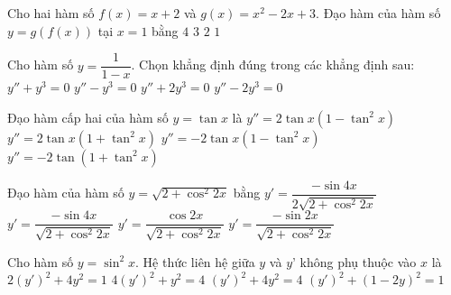 \begin{ex}%
	Cho hai hàm số $f\left( x \right) = x + 2$ và $g\left( x \right) = x^2 - 2x + 3$. Đạo hàm của hàm số $y = g\left( f\left( x \right) \right)$ tại $ x=1 $ bằng
	\choice
	{\True $ 4 $}
	{$ 3 $}
	{$ 2 $}
	{$ 1 $}
	\end{ex}
	
\begin{ex}%
	Cho hàm số $y = \dfrac{1}{{1 - x}}$. Chọn khẳng định đúng trong các khẳng định sau:
	\choice
	{$y'' + y^3 = 0$}
	{$y'' - y^3 = 0$}
	{$y'' + 2y^3 = 0$}
	{\True $y'' - 2y^3 = 0$}
	\end{ex}

\begin{ex}%
Đạo hàm cấp hai của hàm số $y = \tan x$ là
	\choice
	{$y'' = 2\tan x \left(1 - \tan^2 x \right)$}
	{\True $y'' = 2\tan x \left(1 + \tan^2 x \right)$}
	{$y'' =  - 2\tan x \left(1 - \tan^2 x \right)$}
	{$y'' =  - 2\tan \left(1 + \tan^2 x \right)$}
\end{ex} 

\begin{ex}%
Đạo hàm của hàm số $y = \sqrt{2 + \cos^2 2x}$ bằng
	\choice
	{$y' = \dfrac{- \sin 4x}{2\sqrt {2 + \cos^2 2x}}$}
	{\True $y' = \dfrac{- \sin 4x}{\sqrt{2 + \cos^2 2x}}$}
	{$y' = \dfrac{\cos 2x}{\sqrt{2 + \cos^2 2x}}$}
	{$y' = \dfrac{- \sin 2x}{\sqrt {2 + \cos^2 2x}}$}
\end{ex}

\begin{ex}%
Cho hàm số $y = \sin ^2 x$. Hệ thức liên hệ giữa $y$ và $y’$ không phụ thuộc vào $x$ là 
	\choice
	{$2(y')^2 + 4y^2 = 1$}
	{$4(y')^2 + y^2 = 4$}
	{$(y')^2 + 4y^2 = 4$}
	{\True $(y')^2 + (1 - 2y)^2 = 1$}
\end{ex}

